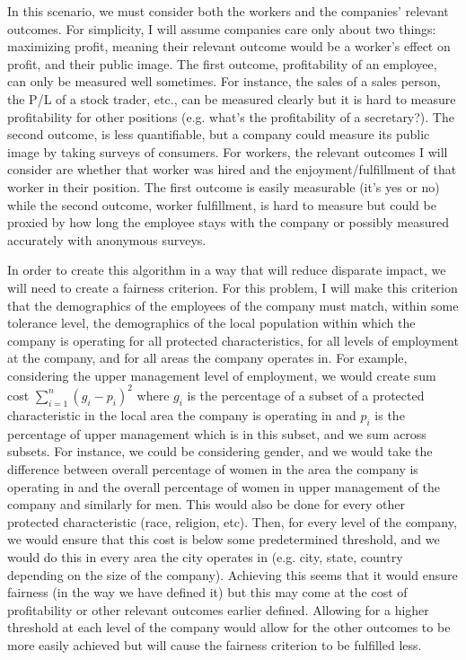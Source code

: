 \documentclass[submit]{harvardml}
\begin{document}
In this scenario, we must consider both the workers and the companies' relevant outcomes. For simplicity, I will assume companies care only about two things: maximizing profit, meaning their relevant outcome would be a worker's effect on profit, and their public image. The first outcome, profitability of an employee, can only be measured well sometimes. For instance, the sales of a sales person, the P/L of a stock trader, etc., can be measured clearly but it is hard to measure profitability for other positions (e.g. what's the profitability of a secretary?). The second outcome, is less quantifiable, but a company could measure its public image by taking surveys of consumers. For workers, the relevant outcomes I will consider are whether that worker was hired and the enjoyment/fulfillment of that worker in their position. The first outcome is easily measurable (it's yes or no) while the second outcome, worker fulfillment, is hard to measure but could be proxied by how long the employee stays with the company or possibly measured accurately with anonymous surveys.

In order to create this algorithm in a way that will reduce disparate impact, we will need to create a fairness criterion. For this problem, I will make this criterion that the demographics of the employees of the company must match, within some tolerance level, the demographics of the local population within which the company is operating for all protected characteristics, for all levels of employment at the company, and for all areas the company operates in. For example, considering the upper management level of employment, we would create sum cost $ \sum_{i=1}^n (g_i- p_i)^2 $ where $g_i$ is the percentage of a subset of a protected characteristic in the local area the company is operating in and $p_i$ is the percentage of upper management which is in this subset, and we sum across subsets. For instance, we could be considering gender, and we would take the difference between overall percentage of women in the area the company is operating in and the overall percentage of women in upper management of the company and similarly for men. This would also be done for every other protected characteristic (race, religion, etc). Then, for every level of the company, we would ensure that this cost is below some predetermined threshold, and we would do this in every area the city operates in (e.g. city, state, country depending on the size of the company). Achieving this seems that it would ensure fairness (in the way we have defined it) but this may come at the cost of profitability or other relevant outcomes earlier defined. Allowing for a higher threshold at each level of the company would allow for the other outcomes to be more easily achieved but will cause the fairness criterion to be fulfilled less. 
\end{document}
